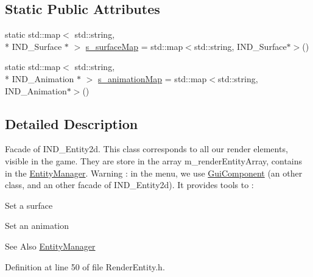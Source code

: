 \subsection*{Static Public Attributes}
\begin{DoxyCompactItemize}
\item 
static std\-::map$<$ std\-::string, \\*
I\-N\-D\-\_\-\-Surface $\ast$ $>$ \hyperlink{class_symp_1_1_render_entity_a98acc72744a48bef45dcf4b0a9b0e8f7}{s\-\_\-surface\-Map} = std\-::map$<$std\-::string, I\-N\-D\-\_\-\-Surface$\ast$$>$()
\item 
static std\-::map$<$ std\-::string, \\*
I\-N\-D\-\_\-\-Animation $\ast$ $>$ \hyperlink{class_symp_1_1_render_entity_a6d0e13d1ba5cd1eaad7820e774acc867}{s\-\_\-animation\-Map} = std\-::map$<$std\-::string, I\-N\-D\-\_\-\-Animation$\ast$$>$()
\end{DoxyCompactItemize}


\subsection{Detailed Description}
Facade of I\-N\-D\-\_\-\-Entity2d. This class corresponds to all our render elements, visible in the game. They are store in the array m\-\_\-render\-Entity\-Array, contains in the \hyperlink{class_symp_1_1_entity_manager}{Entity\-Manager}. Warning \-: in the menu, we use \hyperlink{class_symp_1_1_gui_component}{Gui\-Component} (an other class, and an other facade of I\-N\-D\-\_\-\-Entity2d). It provides tools to \-:
\begin{DoxyItemize}
\item Set a surface
\item Set an animation \begin{DoxySeeAlso}{See Also}
\hyperlink{class_symp_1_1_entity_manager}{Entity\-Manager} 
\end{DoxySeeAlso}

\end{DoxyItemize}

Definition at line 50 of file Render\-Entity.\-h.



